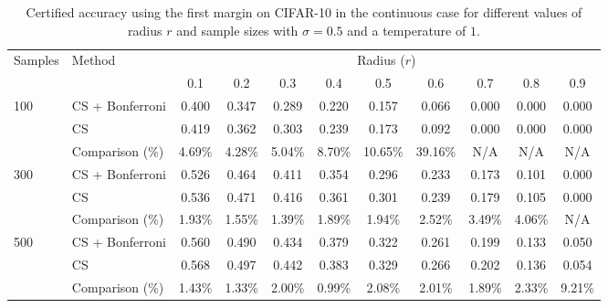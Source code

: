 \begin{table}[htbp]
    \centering
    \caption{Certified accuracy using the first margin on CIFAR-10 in the continuous case for different values of radius $r$ and sample sizes with $\sigma = 0.5$ and a temperature of $1$.}
    \label{tab:certified-accuracy}
    \renewcommand{\arraystretch}{1.2}
    \begin{tabular}{@{}ll*{9}{c}@{}}
        \toprule
        \multirow{2}{*}{Samples} & \multirow{2}{*}{Method} & \multicolumn{9}{c}{Radius ($r$)} \\
        \cmidrule(l){3-11}
        & & 0.1 & 0.2 & 0.3 & 0.4 & 0.5 & 0.6 & 0.7 & 0.8 & 0.9 \\
        \midrule
        \multirow{3}{*}{100}
        & CS + Bonferroni & 0.400 & 0.347 & 0.289 & 0.220 & 0.157 & 0.066 & 0.000 & 0.000 & 0.000 \\
        & CS              & 0.419 & 0.362 & 0.303 & 0.239 & 0.173 & 0.092 & 0.000 & 0.000 & 0.000 \\
        & Comparison (\%) & 4.69\% & 4.28\% & 5.04\% & 8.70\% & 10.65\% & 39.16\% & N/A & N/A & N/A \\
        \midrule
        \multirow{3}{*}{300}
        & CS + Bonferroni & 0.526 & 0.464 & 0.411 & 0.354 & 0.296 & 0.233 & 0.173 & 0.101 & 0.000 \\
        & CS              & 0.536 & 0.471 & 0.416 & 0.361 & 0.301 & 0.239 & 0.179 & 0.105 & 0.000 \\
        & Comparison (\%) & 1.93\% & 1.55\% & 1.39\% & 1.89\% & 1.94\% & 2.52\% & 3.49\% & 4.06\% & N/A \\
        \midrule
        \multirow{3}{*}{500}
        & CS + Bonferroni & 0.560 & 0.490 & 0.434 & 0.379 & 0.322 & 0.261 & 0.199 & 0.133 & 0.050 \\
        & CS              & 0.568 & 0.497 & 0.442 & 0.383 & 0.329 & 0.266 & 0.202 & 0.136 & 0.054 \\
        & Comparison (\%) & 1.43\% & 1.33\% & 2.00\% & 0.99\% & 2.08\% & 2.01\% & 1.89\% & 2.33\% & 9.21\% \\
        \bottomrule
    \end{tabular}
\end{table}
